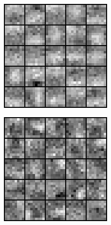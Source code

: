 \begin{figure}
  \centering
  \begin{subfigure}{0.3\columnwidth}
    \includegraphics[width=\linewidth]{figures/chapter6/entropy_filter/bot_filts_dr}
  \end{subfigure}
  \begin{subfigure}{0.3\columnwidth}
    \includegraphics[width=\linewidth]{figures/chapter6/entropy_filter/mid_filts_dr}

\end{subfigure}
\end{figure}
